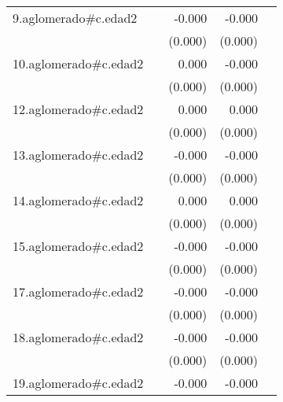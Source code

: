 {\begin{longtable}{l*{4}{D{.}{.}{-1}}}
\addlinespace
9.aglomerado#c.edad2&                     &      -0.000         &      -0.000         &                     \\
            &                     &     (0.000)         &     (0.000)         &                     \\
\addlinespace
10.aglomerado#c.edad2&                     &       0.000         &      -0.000         &                     \\
            &                     &     (0.000)         &     (0.000)         &                     \\
\addlinespace
12.aglomerado#c.edad2&                     &       0.000         &       0.000         &                     \\
            &                     &     (0.000)         &     (0.000)         &                     \\
\addlinespace
13.aglomerado#c.edad2&                     &      -0.000         &      -0.000\sym{***}&                     \\
            &                     &     (0.000)         &     (0.000)         &                     \\
\addlinespace
14.aglomerado#c.edad2&                     &       0.000         &       0.000         &                     \\
            &                     &     (0.000)         &     (0.000)         &                     \\
\addlinespace
15.aglomerado#c.edad2&                     &      -0.000         &      -0.000\sym{**} &                     \\
            &                     &     (0.000)         &     (0.000)         &                     \\
\addlinespace
17.aglomerado#c.edad2&                     &      -0.000         &      -0.000\sym{*}  &                     \\
            &                     &     (0.000)         &     (0.000)         &                     \\
\addlinespace
18.aglomerado#c.edad2&                     &      -0.000         &      -0.000         &                     \\
            &                     &     (0.000)         &     (0.000)         &                     \\
\addlinespace
19.aglomerado#c.edad2&                     &      -0.000         &      -0.000         &                     \\

\end{longtable}}
